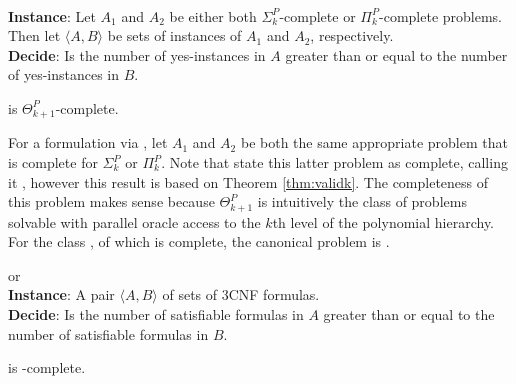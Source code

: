 \begin{problem}{} \citep{compsat} \\
    \tab \textbf{Instance}: Let $A_1$ and $A_2$ be either both $\Sigma_k^P$-complete
or $\Pi_k^P$-complete problems.
    Then let $\langle A,B \rangle$ be sets of instances of $A_1$ and
    $A_2$, respectively.\\
    \tab \textbf{Decide}: Is the number of yes-instances in $A$
    greater than or equal to the number of yes-instances in $B$.
\end{problem}

\begin{theorem}\label{thm:validk} \citep{compsat}
     is $\Theta_{k+1}^P$-complete.
\end{theorem}

For a formulation via , let $A_1$ and $A_2$ be
both the
same appropriate  problem that is complete for
$\Sigma_k^P$ or $\Pi_k^P$.
Note that \citet{compsat} state this latter problem as complete,
calling it , however this result is based on Theorem
\ref{thm:validk}.
The completeness of this problem makes sense because
$\Theta_{k+1}^P$ is intuitively the
class of problems solvable with parallel oracle access to the $k$th level of
the polynomial hierarchy.
For the class \tp, of which \dwin is complete, the canonical problem is \csat.

\begin{problem}{\csat or } \citep{compsat}\\
    \tab \textbf{Instance}: A pair $\langle A,B \rangle$
of sets of 3CNF formulas.\\
    \tab \textbf{Decide}: Is the number of satisfiable formulas in $A$
    greater than or equal to the number of satisfiable formulas in $B$.
\end{problem}


\begin{theorem}\label{thm:csat} \citep{compsat}
    \csat is \tp-complete.
\end{theorem}



